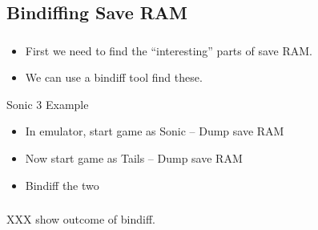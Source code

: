 \documentclass{beamer}
\begin{document}

\subsection{Bindiffing Save RAM}

\begin{frame}[fragile]
\frametitle{\insertsubsection}

\begin{itemize}
\item First we need to find the ``interesting'' parts of save RAM.
\item We can use a bindiff tool find these.
\end{itemize}

\vfill

\begin{block}{Sonic 3 Example}
\begin{itemize}
\item In emulator, start game as Sonic -- Dump save RAM
\item Now start game as Tails -- Dump save RAM
\item Bindiff the two
\end{itemize}
\end{block}

\end{frame}


\begin{frame}[fragile]
\frametitle{\insertsubsection}

XXX show outcome of bindiff.

\end{frame}


\end{document}
